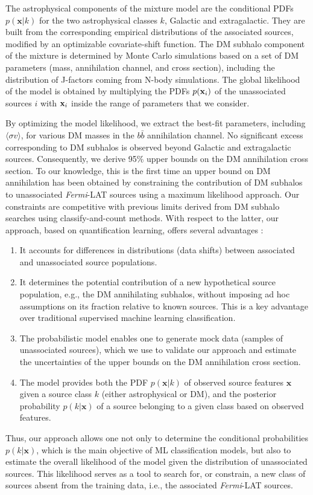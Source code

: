 \documentclass[12pt, a4paper]{article}
\newcommand{\Fermi}{{\sl Fermi}}
\newcommand{\sigmav}{\langle \sigma v \rangle}
\begin{document}
The astrophysical components of the mixture model are the conditional PDFs $p(\mathbf{x}|k)$ for the two astrophysical classes $k$, Galactic and extragalactic.
They are built from the corresponding empirical distributions of the associated sources, modified by an optimizable covariate-shift function. The DM subhalo component of the mixture is determined by Monte Carlo simulations based on a set of DM parameters (mass, annihilation channel, and cross section), including the distribution of J-factors coming from N-body simulations. The global likelihood of the model is obtained by multiplying the PDFs $p({\bf x}_i)$ of the unassociated sources $i$ with ${\bf x}_i$ inside the range of parameters that we consider. 

By optimizing the model likelihood, we extract the best-fit parameters, including $\sigmav$, for various DM masses in the $b\bar{b}$ annihilation channel.
No significant excess corresponding to DM subhalos is observed beyond Galactic and extragalactic sources.
Consequently, we derive 95\% upper bounds on the DM annihilation cross section. To our knowledge, this is the first time an upper bound on DM annihilation has been obtained by constraining the contribution of DM subhalos to unassociated \Fermi-LAT sources using a maximum likelihood approach.
Our constraints are competitive with previous limits derived from DM subhalo searches using classify-and-count methods.
With respect to the latter, our approach, based on quantification learning, offers several advantages :
\begin{enumerate}[label=(\roman*)]
    \item It accounts for differences in distributions (data shifts) between associated and unassociated source populations.
    \item It determines the potential contribution of a new hypothetical source population, e.g., the DM annihilating subhalos, without imposing ad hoc assumptions on its fraction relative to known sources. This is a key advantage over traditional supervised machine learning classification.
    \item The probabilistic model enables one to generate mock data (samples of unassociated sources), which we use to validate our approach and estimate the uncertainties of the upper bounds on the DM annihilation cross section. 
    \item The model provides both the PDF $p(\mathbf{x}|k)$ of observed source features $\mathbf{x}$ given a source class $k$ (either astrophysical or DM), and the posterior probability $p(k|\mathbf{x})$ of a source belonging to a given class based on observed features.
\end{enumerate}
Thus, our approach allows one not only to determine
the conditional probabilities $p(k|\mathbf{x})$, which is the main objective of ML classification models, but also to estimate the overall likelihood of the model given the distribution of unassociated sources. This likelihood serves as a tool to search for, or constrain, a new class of sources absent from the training data, i.e., the associated \Fermi-LAT sources.
\end{document}
